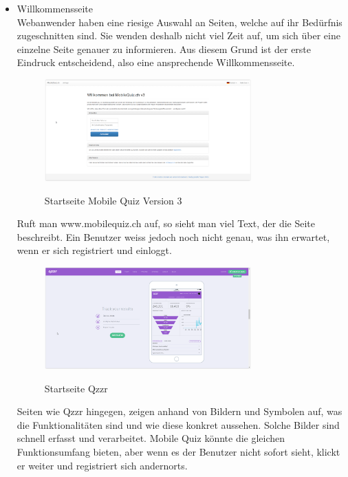 	\begin{itemize}
		\item Willkommensseite \\
		Webanwender haben eine riesige Auswahl an Seiten, welche auf ihr Bedürfnis zugeschnitten sind. Sie wenden deshalb nicht viel Zeit auf, um sich über eine einzelne Seite genauer zu informieren. Aus diesem Grund ist der erste Eindruck entscheidend, also eine ansprechende Willkommensseite. \\
		
		\begin{figure}[H]
			\centering
			\includegraphics[width=0.75\textwidth]{Images/MobileQuiz_StartPage.PNG}
			\caption{Startseite Mobile Quiz Version 3}
			\cite{mobilequiz.ch}
		\end{figure}
		
		Ruft man www.mobilequiz.ch auf, so sieht man viel Text, der die Seite beschreibt. Ein Benutzer weiss jedoch noch nicht genau, was ihn erwartet, wenn er sich registriert und einloggt.
		
		\begin{figure}[H]
			\centering
			\includegraphics[width=0.75\textwidth]
			{Images/Qzzr_StartPage_Statistics.PNG}
			\caption{Startseite Qzzr}
			\cite{qzzr.com}
		\end{figure}
				
		Seiten wie Qzzr \cite{qzzr.com} hingegen, zeigen anhand von Bildern und Symbolen auf, was die Funktionalitäten sind und wie diese konkret aussehen. Solche Bilder sind schnell erfasst  und verarbeitet.
		Mobile Quiz könnte die gleichen Funktionsumfang bieten, aber wenn es der Benutzer nicht sofort sieht, klickt er weiter und registriert sich andernorts.
		

\end{itemize}
